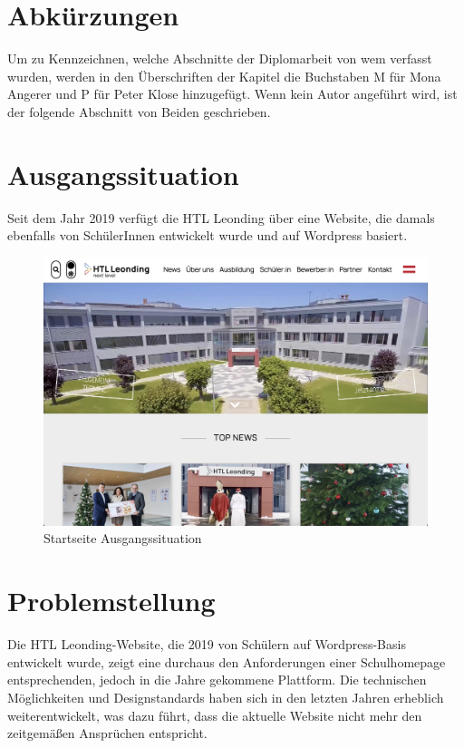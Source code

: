 \section{Abkürzungen}
Um zu Kennzeichnen, welche Abschnitte der Diplomarbeit von wem verfasst wurden,
werden in den Überschriften der Kapitel die Buchstaben M für Mona Angerer und P für Peter Klose
hinzugefügt. Wenn kein Autor angeführt wird, ist der folgende Abschnitt von 
Beiden geschrieben.


\section{Ausgangssituation}
Seit dem Jahr 2019 verfügt die HTL Leonding über eine Website, 
die damals ebenfalls von SchülerInnen entwickelt wurde und auf Wordpress basiert. 

\begin{figure}
    \centering
    \includegraphics[scale=0.3]{pics/startseite_ausgangslage.png}
    \caption{Startseite Ausgangssituation}
    \label{fig:impl:startseite_ausgangslage}
\end{figure}


\section{Problemstellung}
Die HTL Leonding-Website, die 2019 von Schülern auf Wordpress-Basis entwickelt wurde, 
zeigt eine durchaus den Anforderungen einer Schulhomepage entsprechenden, 
jedoch in die Jahre gekommene Plattform. Die technischen Möglichkeiten und Designstandards haben 
sich in den letzten Jahren erheblich weiterentwickelt, was dazu führt, dass die aktuelle 
Website nicht mehr den zeitgemäßen Ansprüchen entspricht. 

